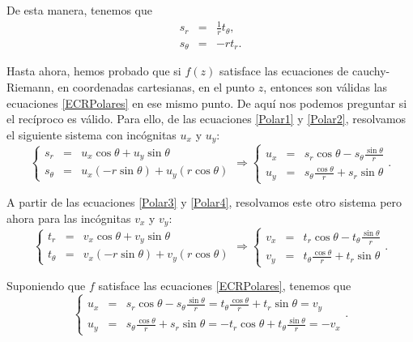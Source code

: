 De esta manera, tenemos que 
\begin{equation}
\boxed{\begin{array}{ccc}
s_r & =& \frac{1}{r}t_{\theta}, \\
s_{\theta} &=& - r t_r.
\end{array}  } \label{ECRPolares}
\end{equation}

Hasta ahora, hemos probado que si $f(z)$ satisface las ecuaciones de cauchy-Riemann, en coordenadas cartesianas, en el punto $z$, entonces son válidas las ecuaciones  \eqref{ECRPolares} en ese mismo punto. De aquí nos podemos preguntar si el recíproco es válido. Para ello, de las ecuaciones \eqref{Polar1} y \eqref{Polar2}, resolvamos el siguiente sistema con incógnitas $u_x$ y $u_y$:
\begin{equation}
\left\{ \begin{array}{ccc}
s_r & =& u_x \cos \theta + u_y \sin \theta \\
s_{\theta} &=&  u_x (-r \sin \theta) + u_y (r \cos \theta)
\end{array} \right.  \Rightarrow \left\{ \begin{array}{ccc}
u_x &=& s_r \cos \theta - s_{\theta} \frac{\sin\theta}{r}\\
u_y &=&  s_{\theta} \frac{\cos \theta}{r} + s_r \sin \theta
\end{array} \right. .
\end{equation}
 
A partir de las ecuaciones \eqref{Polar3} y \eqref{Polar4}, resolvamos este otro sistema pero ahora para las incógnitas $v_x$ y $v_y$:
\begin{equation}
\left\{ \begin{array}{ccc}
t_r & =&  v_x \cos \theta + v_y \sin\theta  \\
t_{\theta} &=& v_x (-r \sin \theta) + v_y (r \cos \theta)
\end{array} \right.  \Rightarrow \left\{ \begin{array}{ccc}
v_x &=& t_r \cos \theta - t_{\theta} \frac{\sin\theta}{r}\\
v_y &=&  t_{\theta} \frac{\cos \theta}{r} + t_r \sin \theta
\end{array} \right.  .
\end{equation}

Suponiendo que $f$ satisface las ecuaciones \eqref{ECRPolares}, tenemos que 
\begin{equation}
\left\{ \begin{array}{ccc}
u_x & =&  s_r \cos \theta - s_{\theta} \frac{\sin\theta}{r} = t_{\theta} \frac{\cos \theta}{r} + t_r \sin \theta = v_y \\
u_y &=&  s_{\theta} \frac{\cos \theta}{r} + s_r \sin \theta = -t_r \cos \theta + t_{\theta} \frac{\sin\theta}{r} = - v_x
\end{array} \right. .
\end{equation}

